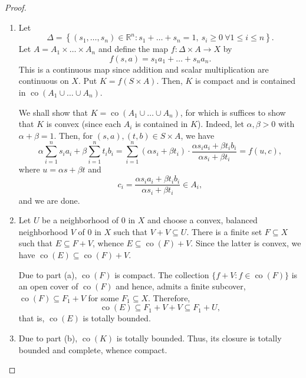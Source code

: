 \documentclass[12pt]{article}
\theoremstyle{thmstyle}
\theoremstyle{defstyle}
\newcommand{\R}{\mathbb{R}}
\renewcommand{\le}{\leqslant}
\renewcommand{\ge}{\geqslant}
\newcommand{\co}{\operatorname{co}}
\begin{document}
\begin{proof}
\begin{enumerate}[label=(\alph*)]
    \item Let 
    \begin{equation*}
        \Delta = \left\{(s_1,\dots,s_n)\in\R^n\colon s_1 + \dots + s_n = 1,~s_i\ge 0~\forall 1\le i\le n\right\}.
    \end{equation*}
    Let $A = A_1\times\dots\times A_n$ and define the map $f: \Delta\times A\to X$ by 
    \begin{equation*}
        f(s, a) = s_1a_1 + \dots + s_na_n.
    \end{equation*}
    This is a continuous map since addition and scalar multiplication are continuous on $X$. Put $K = f(S\times A)$. Then, $K$ is compact and is contained in $\co(A_1\cup\dots\cup A_n)$.

    We shall show that $K = \co(A_1\cup\dots\cup A_n)$, for which is suffices to show that $K$ is convex (since each $A_i$ is contained in $K$). Indeed, let $\alpha,\beta > 0$ with $\alpha + \beta = 1$. Then, for $(s, a), (t, b)\in S\times A$, we have 
    \begin{equation*}
        \alpha\sum_{i = 1}^n s_ia_i + \beta\sum_{i = 1}^n t_ib_i = \sum_{i = 1}^n (\alpha s_i + \beta t_i)\cdot\frac{\alpha s_ia_i + \beta t_ib_i}{\alpha s_i + \beta t_i} = f(u, c),
    \end{equation*}
    where $u = \alpha s + \beta t$ and 
    \begin{equation*}
        c_i = \frac{\alpha s_ia_i + \beta t_ib_i}{\alpha s_i + \beta t_i}\in A_i,
    \end{equation*}
    and we are done.

    \item Let $U$ be a neighborhood of $0$ in $X$ and choose a convex, balanced neighborhood $V$ of $0$ in $X$ such that $V + V\subseteq U$. There is a finite set $F\subseteq X$ such that $E\subseteq F+ V$, whence $E\subseteq\co(F) + V$. Since the latter is convex, we have $\co(E)\subseteq \co(F) + V$.

    Due to part (a), $\co(F)$ is compact. The collection $\{f + V\colon f\in\co(F)\}$ is an open cover of $\co(F)$ and hence, admits a finite subcover, $\co(F)\subseteq F_1 + V$ for some $F_1\subseteq X$. Therefore, 
    \begin{equation*}
        \co(E)\subseteq F_1 + V + V\subseteq F_1 + U,
    \end{equation*}
    that is, $\co(E)$ is totally bounded.

    \item Due to part (b), $\co(K)$ is totally bounded. Thus, its closure is totally bounded and complete, whence compact. \qedhere
\end{enumerate}
\end{proof}
\end{document}
